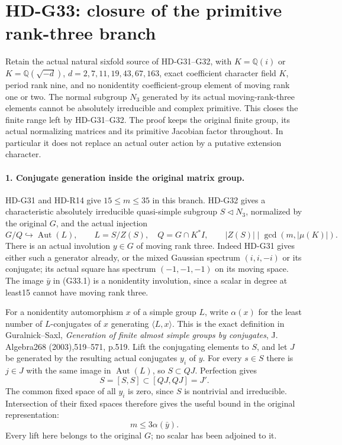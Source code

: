 \section{HD-G33: closure of the primitive rank-three branch}
\label{sec:primitive-rank-three-finite-closure}

Retain the actual natural sixfold source of HD-G31--G32, with
\(K=\mathbb Q(i)\) or
\(K=\mathbb Q(\sqrt{-d})\), \(d=2,7,11,19,43,67,163\), exact
coefficient character field \(K\), period rank nine, and no
nonidentity coefficient-group element of moving rank one or two.
The normal subgroup \(N_3\) generated by its actual moving-rank-three
elements cannot be absolutely irreducible and complex primitive.
This closes the finite range left by HD-G31--G32. The proof keeps
the original finite group, its actual normalizing matrices and its
primitive Jacobian factor throughout. In particular it does not
replace an actual outer action by a putative extension character.

\paragraph{1. Conjugate generation inside the original matrix group.}
HD-G31 and HD-R14 give \(15\le m\le35\) in this branch. HD-G32
gives a characteristic absolutely irreducible quasi-simple subgroup
\(S\triangleleft N_3\), normalized by the original \(G\), and
the actual injection
\[
 G/Q\hookrightarrow\operatorname{Aut}(L),\qquad
 L=S/Z(S),\quad Q=G\cap K^*I,
 \qquad |Z(S)|\mid\gcd(m,|\mu(K)|).                 \tag{G33.1}
\]
There is an actual involution \(y\in G\) of moving rank three.
Indeed HD-G31 gives either such a generator already, or the mixed
Gaussian spectrum \((i,i,-i)\) or its conjugate; its actual square
has spectrum \((-1,-1,-1)\) on its moving space. The image
\(\bar y\) in (G33.1) is a nonidentity involution, since a scalar
in degree at least15 cannot have moving rank three.

For a nonidentity automorphism \(x\) of a simple group \(L\),
write \(\alpha(x)\) for the least number of \(L\)-conjugates of
\(x\) generating \(\langle L,x\rangle\). This is the exact
definition in Guralnick--Saxl, \emph{Generation of finite almost
simple groups by conjugates}, J. Algebra268 (2003),519--571,
p.519. Lift the conjugating elements to \(S\), and let \(J\)
be generated by the resulting actual conjugates \(y_i\) of \(y\).
For every \(s\in S\) there is \(j\in J\) with the same image in
\(\operatorname{Aut}(L)\), so \(S\subset QJ\). Perfection gives
\[
 S=[S,S]\subset[QJ,QJ]=J'.
\]
The common fixed space of all \(y_i\) is zero, since \(S\) is
nontrivial and irreducible. Intersection of their fixed spaces
therefore gives the useful bound in the original representation:
\[
                        m\le3\alpha(\bar y).                \tag{G33.2}
\]
Every lift here belongs to the original \(G\); no scalar has been
adjoined to it.

